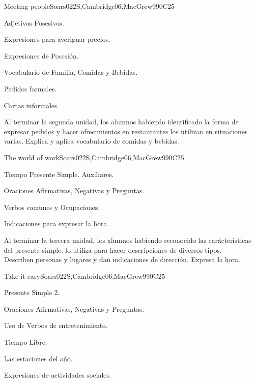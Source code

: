 \begin{syllabus}
\begin{unit}{Meeting people}{}{Soars022S,Cambridge06,MacGrew99}{0}{C25}
   \begin{topics}
      \item Adjetivos Posesivos.
      \item Expresiones para averiguar precios.
      \item Expresiones de Posesión.
      \item Vocabulario de Familia, Comidas y Bebidas.
      \item Pedidos formales.
      \item Cartas informales.
   \end{topics}

   \begin{learningoutcomes}
      \item Al terminar la segunda unidad, los alumnos habiendo identificado la forma de expresar pedidos y hacer ofrecimientos en restaurantes los utilizan en situaciones varias. Explica y aplica vocabulario de comidas y bebidas.  
   \end{learningoutcomes}

\end{unit}

\begin{unit}{The world of work}{}{Soars022S,Cambridge06,MacGrew99}{0}{C25}
   \begin{topics}
      \item Tiempo Presente Simple. Auxiliares.
      \item Oraciones Afirmativas, Negativas y Preguntas.
      \item Verbos comunes y Ocupaciones.
      \item Indicaciones para expresar la hora.
   \end{topics}

   \begin{learningoutcomes}
      \item Al terminar la tercera unidad, los alumnos habiendo reconocido las carácteristicas  del presente simple, lo utiliza para hacer descripciones de diversos tipos. Describen personas y lugares y dan indicaciones de dirección. Expresa la hora. 
   \end{learningoutcomes}

\end{unit}

\begin{unit}{Take it easy}{}{Soars022S,Cambridge06,MacGrew99}{0}{C25}
   \begin{topics}
      \item Presente Simple 2.
      \item Oraciones Afirmativas, Negativas y Preguntas.
      \item Uso de Verbos de entretenimiento.
      \item Tiempo Libre.
      \item Las estaciones del año.
      \item Expresiones de actividades sociales.
   \end{topics}


\end{unit}
\end{syllabus}
